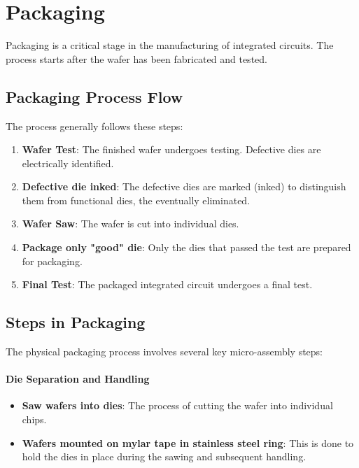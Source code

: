 \documentclass{report}
\begin{document}
\clearpage
\chapter{Packaging}

Packaging is a critical stage in the manufacturing of integrated circuits. The process starts after the wafer has been fabricated and tested.

\section{Packaging Process Flow}

The process generally follows these steps:
\begin{enumerate}
    \item \textbf{Wafer Test}: The finished wafer undergoes testing. Defective dies are electrically identified.
    \item \textbf{Defective die inked}: The defective dies are marked (inked) to distinguish them from functional dies, the eventually eliminated.
    \item \textbf{Wafer Saw}: The wafer is cut into individual dies.
    \item \textbf{Package only "good" die}: Only the dies that passed the test are prepared for packaging.
    \item \textbf{Final Test}: The packaged integrated circuit undergoes a final test.
\end{enumerate}

\section{Steps in Packaging}

The physical packaging process involves several key micro-assembly steps:

\subsubsection{Die Separation and Handling}
\begin{itemize}
    \item \textbf{Saw wafers into dies}: The process of cutting the wafer into individual chips.
    \item \textbf{Wafers mounted on mylar tape in stainless steel ring}: This is done to hold the dies in place during the sawing and subsequent handling.
\end{itemize}
\end{document}
